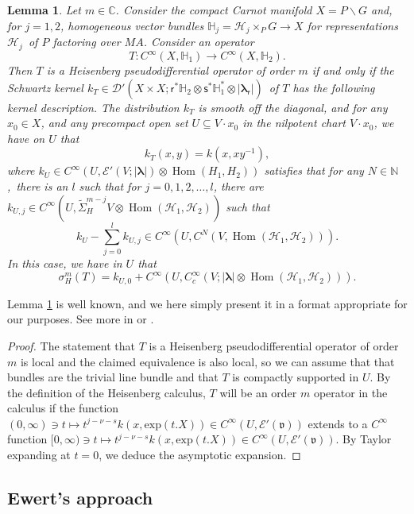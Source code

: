 \documentclass[a4paper,reqno]{amsart}
\numberwithin{equation}{section}
\def\Hom{\operatorname{Hom}}
\def\C{\mathbb{C}}
\def\N{\mathbb{N}}
\newtheorem{lemma}[thm]{Lemma}
\theoremstyle{definition}
\theoremstyle{remark}
\begin{document}
\begin{lemma}
\label{lemkernel}
Let $m\in \C$. Consider the compact Carnot manifold $X=P\backslash G$ and, for $j=1,2$, homogeneous vector bundles $\mathbb{H}_j=\mathcal{H}_j\times_P G\to X$ for representations $\mathcal{H}_j$ of $P$ factoring over $MA$. Consider an operator 
$$T: C^\infty(X, \mathbb{H}_1)\to C^\infty(X, \mathbb{H}_2).$$
Then $T$ is a Heisenberg pseudodifferential operator of order $m$ if and only if the Schwartz kernel $k_T\in \mathcal{D}'(X\times X;\mathsf{r}^*\mathbb{H}_2\otimes \mathsf{s}^*\mathbb{H}_1^*\otimes |\pmb{\lambda}_\mathsf{r}|)$ of $T$ has the following kernel description. The distribution $k_T$ is smooth off the diagonal, and for any $x_0\in X$, and any precompact open set $U\subseteq V\cdot x_0$ in the nilpotent chart $V\cdot x_0$, we have on $U$ that 
$$k_T(x,y)=k(x,xy^{-1}) ,$$
where $k_U\in C^\infty(U,\mathcal{E}'(V;|\pmb{\lambda}|)\otimes \Hom(H_1,H_2))$ satisfies that for any $N\in \N$, there is an $l$ such that for $j=0,1,2,\ldots, l$, there are $k_{U,j}\in C^\infty(U,\tilde{\Sigma}_H^{m-j}V\otimes \Hom(\mathcal{H}_1,\mathcal{H}_2))$ such that 
$$k_U-\sum_{j=0}^l k_{U,j}\in C^\infty(U,C^N(V,\Hom(\mathcal{H}_1,\mathcal{H}_2))).$$
 In this case, we have in $U$ that  
 $$\sigma_H^{m}(T)=k_{U,0}+C^\infty(U,C^\infty_c(V;|\pmb{\lambda}|\otimes \Hom(\mathcal{H}_1,\mathcal{H}_2))).$$
 \end{lemma}

Lemma \ref{lemkernel} is well known, and we here simply present it in a format appropriate for our purposes. See more in \cite[Chapter 3.1.4]{pongemonograph} or \cite[Theorem 15.39]{bealsgreiner}.

\begin{proof}
The statement that $T$ is a Heisenberg pseudodifferential operator of order $m$ is local and the claimed equivalence is also local, so we can assume that that bundles are the trivial line bundle and that $T$ is compactly supported in $U$. By the definition of the Heisenberg calculus, $T$ will be an order $m$ operator in the calculus if the function $(0,\infty)\ni t\mapsto t^{j-\nu-s}k(x,\mathrm{exp}(t.X))\in C^\infty(U,\mathcal{E}'(\mathfrak{v}))$ extends to a $C^\infty$ function $[0,\infty)\ni t\mapsto t^{j-\nu-s} k(x,\mathrm{exp}(t.X))\in C^\infty(U,\mathcal{E}'(\mathfrak{v}))$. By Taylor expanding at $t=0$, we deduce the asymptotic expansion. 
 \end{proof}
 
 \subsection{Ewert's approach}
 \label{lknlknaddowow}
 
\end{document}
